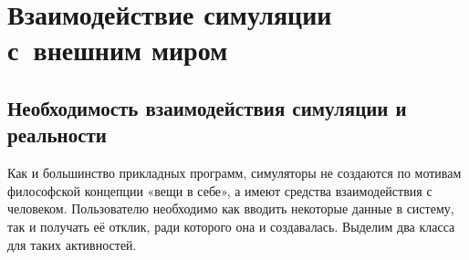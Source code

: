 
\chapter{Взаимодействие симуляции с~внешним миром}\label{paravirt}


\section[Необходимость взаимодействия]{Необходимость взаимодействия симуляции и реальности}

Как и большинство прикладных программ, симуляторы не создаются по мотивам философской концепции «вещи в себе», а имеют средства взаимодействия с человеком. Пользователю необходимо как вводить некоторые данные в систему, так и получать её отклик, ради которого она и создавалась. Выделим два класса для таких активностей.

